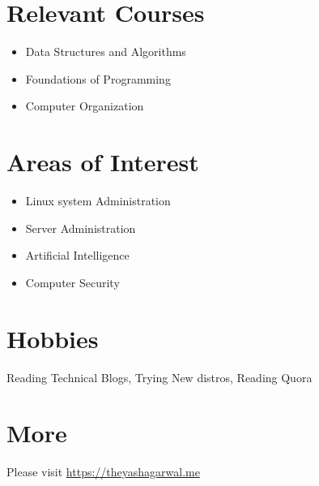 \documentclass[margin, centered]{res}
\begin{document}
\begin{resume}
\section{Relevant \hspace{2mm} Courses}
\begin{itemize}[leftmargin=*]
\item{Data Structures and Algorithms}
\item{Foundations of Programming}
\item{Computer Organization}
\end{itemize}

\section{Areas of \hspace{2mm} Interest}
\begin{itemize}[leftmargin=*]
\item{Linux system Administration}
\item{Server Administration}
\item{Artificial Intelligence}
\item{Computer Security}
\end{itemize}


\section{Hobbies}
Reading Technical Blogs, Trying New distros, Reading Quora

\section{More}
Please visit \href{https://theyashagarwal.me}{https://theyashagarwal.me}

\end{resume}
\end{document}
